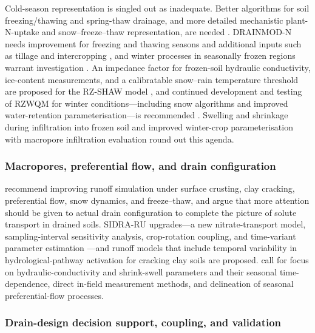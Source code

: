 Cold-season representation is singled out as inadequate. Better algorithms for soil freezing/thawing and spring-thaw drainage, and more detailed mechanistic plant-N-uptake and snow--freeze--thaw representation, are needed \parencite{Feyereisen2006b}. DRAINMOD-N needs improvement for freezing and thawing seasons and additional inputs such as tillage and intercropping \parencite{Yang2007}, and winter processes in seasonally frozen regions warrant investigation \parencite{Saadat2020,Jiang2020}. An impedance factor for frozen-soil hydraulic conductivity, ice-content measurements, and a calibratable snow--rain temperature threshold are proposed for the RZ-SHAW model \parencite{Li2024b}, and continued development and testing of RZWQM for winter conditions---including snow algorithms and improved water-retention parameterisation---is recommended \parencite{Ahmed2007b,Ahmed2007,Yang2021}. Swelling and shrinkage during infiltration into frozen soil \parencite{Roy2020} and improved winter-crop parameterisation with macropore infiltration evaluation \parencite{Motarjemi2021} round out this agenda.

\subsubsection{Macropores, preferential flow, and drain configuration}

\textcite{Smith2020} recommend improving runoff simulation under surface crusting, clay cracking, preferential flow, snow dynamics, and freeze--thaw, and \textcite{Stamm2002} argue that more attention should be given to actual drain configuration to complete the picture of solute transport in drained soils. SIDRA-RU upgrades---a new nitrate-transport model, sampling-interval sensitivity analysis, crop-rotation coupling, and time-variant parameter estimation \parencite{Chelil2022b,Jeantet2021}---and runoff models that include temporal variability in hydrological-pathway activation for cracking clay soils \parencite{Kokulan2019} are proposed. \textcite{Boivin2006} call for focus on hydraulic-conductivity and shrink-swell parameters and their seasonal time-dependence, direct in-field measurement methods, and delineation of seasonal preferential-flow processes.

\subsubsection{Drain-design decision support, coupling, and validation}

